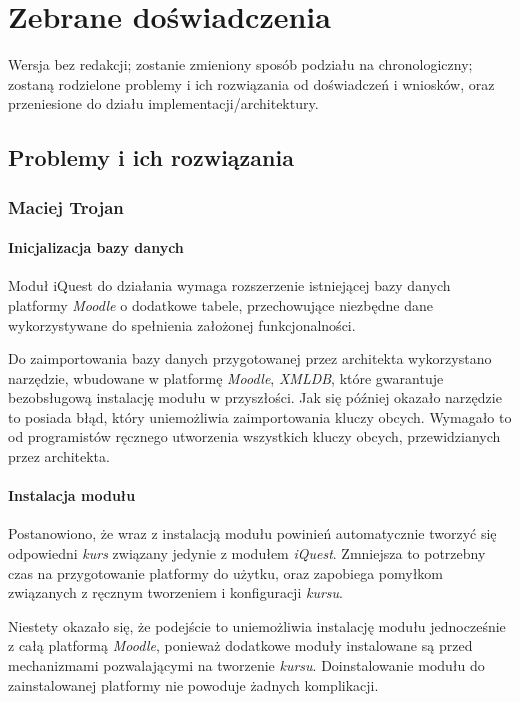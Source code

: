 \chapter{Zebrane doświadczenia}
\label{Chapter8}

{\color{red}Wersja bez redakcji; zostanie zmieniony sposób podziału na chronologiczny; zostaną rodzielone problemy i ich rozwiązania od doświadczeń i wniosków, oraz przeniesione do działu implementacji\slash architektury.}

\section{Problemy i ich rozwiązania}
\subsection{Maciej Trojan}
\subsubsection{Inicjalizacja bazy danych}
Moduł iQuest do działania wymaga rozszerzenie istniejącej bazy danych platformy \emph{Moodle} o dodatkowe tabele, przechowujące niezbędne dane wykorzystywane do spełnienia założonej funkcjonalności.

Do zaimportowania bazy danych przygotowanej przez architekta wykorzystano narzędzie, wbudowane w platformę \emph{Moodle}, \emph{XMLDB}, które gwarantuje bezobsługową instalację modułu w przyszłości. Jak się później okazało narzędzie to posiada błąd, który uniemożliwia zaimportowania kluczy obcych. Wymagało to od programistów ręcznego utworzenia wszystkich kluczy obcych, przewidzianych przez architekta.

\subsubsection{Instalacja modułu}
Postanowiono, że wraz z instalacją modułu powinień automatycznie tworzyć się odpowiedni \emph{kurs} związany jedynie z modułem \emph{iQuest}. Zmniejsza to potrzebny czas na przygotowanie platformy do użytku, oraz zapobiega pomyłkom związanych z ręcznym tworzeniem i konfiguracji \emph{kursu}. 

Niestety okazało się, że podejście to uniemożliwia instalację modułu jednocześnie z całą platformą \emph{Moodle}, ponieważ dodatkowe moduły instalowane są przed mechanizmami pozwalającymi na tworzenie \emph{kursu}. Doinstalowanie modułu do zainstalowanej platformy nie powoduje żadnych komplikacji.

